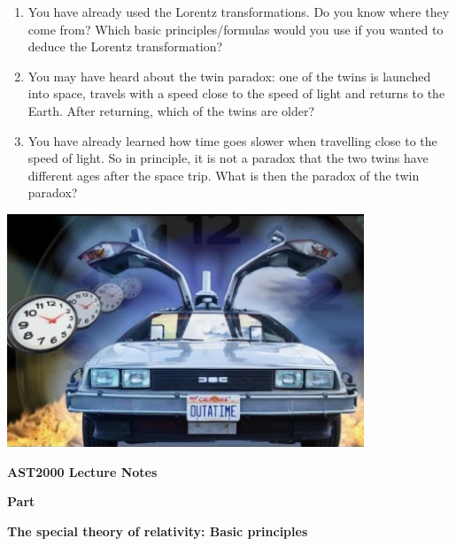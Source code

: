 {\large
\begin{enumerate}
\item You have already used the Lorentz transformations. Do you know where they come from? Which basic principles/formulas would you use if you wanted to deduce the Lorentz transformation?
\item You may have heard about the twin paradox: one of the twins is launched into space, travels with a speed close to the speed of light and returns to the Earth. After returning, which of the twins are older?
\item You have already learned how time goes slower when travelling close to the speed of light. So in principle, it is not a paradox that the two twins have different ages after the space trip. What is then the paradox of the twin paradox?
\end{enumerate}

\begin{Figure}%
\centering
\includegraphics[width=0.8\textwidth]{back_to_the_future.png}
\end{Figure}


\clearpage

\vspace*{2cm}

{\centerline{\bf\huge AST2000 Lecture Notes}}

\vspace*{1cm}

{\centerline{\bf\LARGE Part \PartName}}\vspace*{0.25cm}
{\centerline{\bf\LARGE The special theory of relativity: Basic principles }}

}
